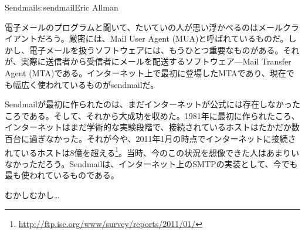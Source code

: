 \begin{aosachapter}{Sendmail}{s:sendmail}{Eric Allman}

電子メールのプログラムと聞いて、たいていの人が思い浮かべるのはメールクライアントだろう。厳密には、Mail User Agent (MUA)と呼ばれているものだ。しかし、電子メールを扱うソフトウェアには、もうひとつ重要なものがある。それが、実際に送信者から受信者にメールを配送するソフトウェア---Mail Transfer Agent (MTA)である。インターネット上で最初に登場したMTAであり、現在でも幅広く使われているものがsendmailだ。

Sendmailが最初に作られたのは、まだインターネットが公式には存在しなかったころである。そして、それから大成功を収めた。1981年に最初に作られたころ、インターネットはまだ学術的な実験段階で、接続されているホストはたかだか数百台に過ぎなかった。それが今や、2011年1月の時点でインターネットに接続されているホストは8億を超える\footnote{\url{http://ftp.isc.org/www/survey/reports/2011/01/}}。当時、今のこの状況を想像できた人はあまりいなかっただろう。Sendmailは、インターネット上のSMTPの実装として、今でも最も使われているものである。

\begin{aosasect1}{むかしむかし\ldots}


\end{aosasect1}
\end{aosachapter}
